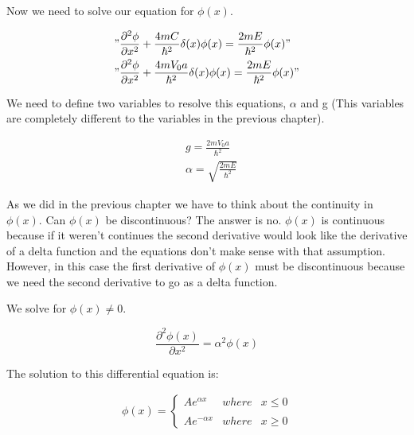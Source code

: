 Now we need to solve our equation for $\phi(x)$.

\begin{equation}
    \label{4.4}
    \begin{split}
    & "\frac{\partial^2\phi}{\partial x^2}+\frac{4mC}{\hbar^2}\delta(x)\phi(x)= \frac{2mE}{\hbar^2}\phi(x)" \\
    & "\frac{\partial^2\phi}{\partial x^2}+\frac{4mV_0a}{\hbar^2}\delta(x)\phi(x)= \frac{2mE}{\hbar^2}\phi(x)"
    \end{split}
\end{equation}

We need to define two variables to resolve this equations, $\alpha$ and g (This variables are completely different to the variables in the previous chapter).

\begin{equation}
    \label{4.5}
    \begin{split}
    & g = \frac{2mV_0a}{\hbar^2} \\
    & \alpha = \sqrt{\frac{2mE}{\hbar^2}}
    \end{split}
\end{equation}

As we did in the previous chapter we have to think about the continuity in $\phi(x)$. Can $\phi(x)$ be discontinuous? The answer is no. $\phi(x)$ is continuous because if it weren't continues the second derivative would look like the derivative of a delta function and the equations don't make sense with that assumption. However, in this case the first derivative of $\phi(x)$ must be discontinuous because we need the second derivative to go as a delta function.

We solve for $\phi(x) \neq 0$.

\begin{equation}
    \label{4.6}
    \frac{\partial^2\phi(x)}{\partial x^2} = \alpha^2\phi(x)
\end{equation}

The solution to this differential equation is:

\begin{equation}
    \label{4.7}
    \begin{split}
        \phi(x)= \left\{ \begin{array}{lcc} Ae^{\alpha x} & where & x \leq 0 \\
        \\ Ae^{-\alpha x} & where & x \geq 0 \end{array} \right.
    \end{split}
\end{equation}

